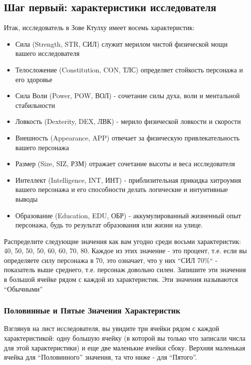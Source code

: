 \documentclass[letterpaper,twocolumn,openany, twoside, 11pt, usenames]{cocbook}
\begin{document}
\subsection*{Шаг первый: характеристики исследователя}
Итак, исследователь в Зове Ктулху имеет восемь характеристик:

\begin{itemize}[leftmargin=4mm]
  \item Сила (Strength, STR, СИЛ) служит мерилом чистой физической мощи вашего исследователя
  \item Телосложение (Constitution, CON, ТЛС) определяет стойкость персонажа и его здоровье
  \item Сила Воли (Power, POW, ВОЛ) - сочетание силы духа, воли и ментальной стабильности
  \item Ловкость (Dexterity, DEX, ЛВК) - мерило физической ловкости и скорости
  \item Внешность (Appearance, APP) отвечает за физическую привлекательность вашего персонажа
  \item Размер (Size, SIZ, РЗМ) отражает сочетание высоты и веса исследователя
  \item Интеллект (Intelligence, INT, ИНТ) - приблизительная прикидка хитроумия вашего персонажа и его способности делать логические и интуитивные выводы
  \item Образование (Education, EDU, ОБР) - аккумулированный жизненный опыт персонажа, будь то результат образования или жизни на улице.
\end{itemize}

Распределите следующие значения как вам угодно среди восьми характеристик: 40, 50, 50, 50, 60, 60, 70, 80. Каждое из этих значение - это процент, т.е. если вы определяете силу персонажа в 70, это означает, что у них ``СИЛ 70\%`` - показатель выше среднего, т.е. персонаж довольно силен. Запишите эти значения в большой ячейке рядом с каждой из характеристик. Эти значения называются ``Обычными''

\subsubsection*{\nohyphens{Половинные и Пятые Значения Характеристик}}

Взглянув на лист исследователя, вы увидите три ячейки рядом с каждой характеристикой: одну большую ячейку (в которой вы только что записали числа для этой характеристики) и еще две маленькие ячейки сбоку. Верхняя маленькая ячейка для ``Половинного'' значения, та что ниже - для ``Пятого''.
\end{document}
